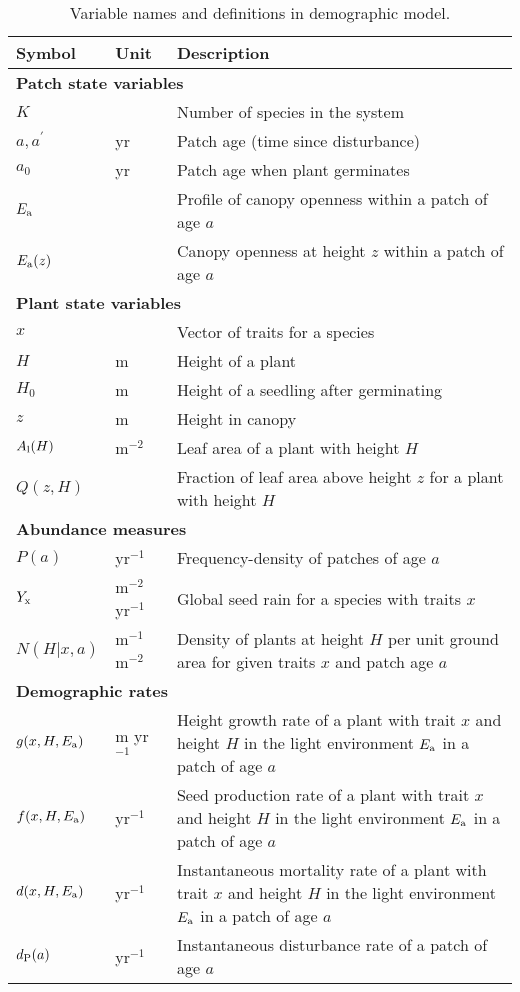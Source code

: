 \documentclass[10pt,twoside]{article}
\begin{document}
\begin{table}[ht]
 \caption{Variable names and definitions in demographic model.}
\centering
  \begin{tabular}{p{2cm}p{2cm}p{9cm}}
  \hline
  Symbol & Unit & Description \\
  \hline
  \multicolumn{3}{l}{\textbf{Patch state variables}} \\
  $K$   & & Number of species in the system \\
  $a, a^{\prime}$ & yr & Patch age (time since disturbance)\\
  $a_0$ & yr & Patch age when plant germinates \\
  $E_{\rm a}$ & & Profile of canopy openness within a patch of age $a$\\
  $E_{\rm a}(z)$&  & Canopy openness at height $z$ within a patch of age $a$\\

  \multicolumn{3}{l}{\textbf{Plant state variables}} \\
  $x$   & & Vector of traits for a species\\
  $H$   & m & Height of a plant\\
  $H_0$   & m  & Height of a seedling after germinating\\
  $z$   & m & Height in canopy\\
  $A_{\rm l}(H)$  & m$^{-2}$ & Leaf area of a plant with height $H$ \\
  $Q(z, H)$ &  & Fraction of leaf area above height $z$ for a plant with height $H$\\

  \multicolumn{3}{l}{\textbf{Abundance measures}} \\
  $P(a)$ & yr$^{-1}$ & Frequency-density of patches of age $a$ \\
  $Y_{\rm x}$ & m$^{-2}$ yr$^{-1}$ & Global seed rain for a species with traits $x$\\
  $N(H | x, a)$ & m$^{-1}$ m$^{-2}$ & Density of plants at height $H$ per unit ground area for given traits $x$ and patch age $a$\\

  \multicolumn{3}{l}{\textbf{Demographic rates}} \\
  $g(x, H, E_{\rm a})$ & m yr$^{-1}$ & Height growth rate of a plant with trait $x$ and height $H$ in the light environment $E_{\rm a}$ in a patch of age $a$\\
  $f(x, H, E_{\rm a})$ & yr$^{-1}$ & Seed production rate of a plant with trait $x$ and height $H$ in the light environment $E_{\rm a}$ in a patch of age $a$\\
  $d(x, H, E_{\rm a})$ & yr$^{-1}$ & Instantaneous mortality rate of a plant with trait $x$ and height $H$ in the light environment $E_{\rm a}$ in a patch of age $a$\\
  $d_{\rm P}(a)$ & yr$^{-1}$ & Instantaneous disturbance rate of a patch of age $a$\\


\end{tabular}
\end{table}
\end{document}

